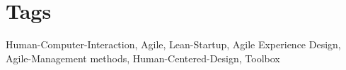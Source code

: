 \section*{Tags}
Human-Computer-Interaction, Agile, Lean-Startup, Agile Experience Design, Agile-Management methods, Human-Centered-Design, Toolbox